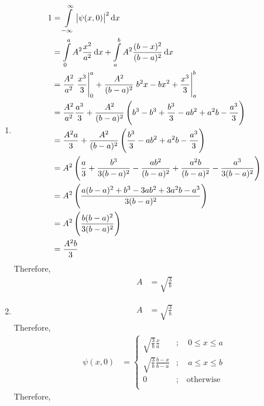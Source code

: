 \documentclass[fleqn, a4paper, 11pt, oneside]{amsart}
\theoremstyle{definition}
\theoremstyle{theorem}
\begin{document}
\begin{solution}
	\begin{enumerate}[leftmargin=*]
		\item
			\begin{align*}
				1 & = \int\limits_{-\infty}^{\infty} \left| \psi(x,0) \right|^2 \dif x                                                        \\
                                  & = \int\limits_{0}^{a} A^2 \frac{x^2}{a^2} \dif x + \int\limits_{a}^{b} A^2 \frac{(b - x)^2}{(b - a)^2} \dif x                             \\
				  &= \frac{A^2}{a^2} \left. \frac{x^3}{3} \right|_{0}^{a} + \frac{A^2}{(b - a)^2} \left. b^2 x - b x^2 + \frac{x^3}{3} \right|_{a}^{b}\\
				  &= \frac{A^2}{a^2} \frac{a^3}{3} + \frac{A^2}{(b - a)^2} \left( b^3 - b^3 + \frac{b^3}{3} - a b^2 + a^2 b - \frac{a^3}{3} \right)\\
				  &= \frac{A^2 a}{3} + \frac{A^2}{(b - a)^2} \left( \frac{b^3}{3} - a b^2 + a^2 b - \frac{a^3}{3} \right)\\
				  &= A^2 \left( \frac{a}{3} + \frac{b^3}{3 (b - a)^2} - \frac{a b^2}{(b - a)^2} + \frac{a^2 b}{(b - a)^2} - \frac{a^3}{3 (b - a)^2} \right)\\
				  &= A^2 \left( \frac{a (b - a)^2 + b^3 - 3 a b^2 + 3 a^2 b - a^3}{3 (b - a)^2} \right)\\
				  &= A^2 \left( \frac{b (b - a)^2}{3 (b - a)^2} \right)\\
				  &= \frac{A^2 b}{3}
			\end{align*}
			Therefore,
			\begin{align*}
				A &= \sqrt{\frac{3}{b}}
			\end{align*}
		\item
			\begin{align*}
				A &= \sqrt{\frac{3}{b}}
			\end{align*}
			Therefore,
			\begin{align*}
				\psi(x,0) &=
					\begin{cases}
						\sqrt{\frac{3}{b}} \frac{x}{a} &;\quad 0 \le x \le a\\
						\sqrt{\frac{3}{b}} \frac{b - x}{b - a} &;\quad a \le x \le b\\
						0 &;\quad \text{otherwise}\\
					\end{cases}
			\end{align*}
			Therefore,
			\begin{figure}[H]
				\centering
\end{figure}
\end{enumerate}
\end{solution}
\end{document}
